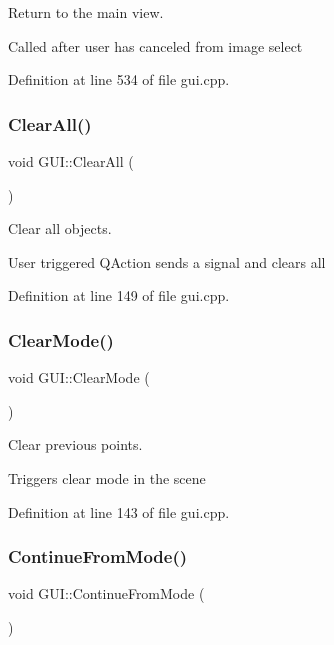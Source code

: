 Return to the main view. 

Called after user has canceled from image select 

Definition at line 534 of file gui.\+cpp.

\mbox{\label{classGUI_a19c82a62a2b41460c81317fa967e3a1e}} 
\subsubsection{\texorpdfstring{Clear\+All()}{ClearAll()}}
{\footnotesize\ttfamily void G\+U\+I\+::\+Clear\+All (\begin{DoxyParamCaption}{ }\end{DoxyParamCaption})}



Clear all objects. 

User triggered Q\+Action sends a signal and clears all 

Definition at line 149 of file gui.\+cpp.

\mbox{\label{classGUI_afb6e169c9372800e69c70a3889420325}} 
\subsubsection{\texorpdfstring{Clear\+Mode()}{ClearMode()}}
{\footnotesize\ttfamily void G\+U\+I\+::\+Clear\+Mode (\begin{DoxyParamCaption}{ }\end{DoxyParamCaption})}



Clear previous points. 

Triggers clear mode in the scene 

Definition at line 143 of file gui.\+cpp.

\mbox{\label{classGUI_a3547730e0fae81b59fcb19d00a370782}} 
\subsubsection{\texorpdfstring{Continue\+From\+Mode()}{ContinueFromMode()}}
{\footnotesize\ttfamily void G\+U\+I\+::\+Continue\+From\+Mode (\begin{DoxyParamCaption}{ }\end{DoxyParamCaption})}



